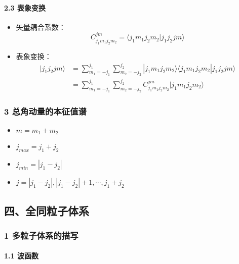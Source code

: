 \documentclass[UTF8,twocolumn]{ctexart}
\providecommand{\tightlist}{%
  \setlength{\itemsep}{0pt}\setlength{\parskip}{0pt}}
\let\oldparagraph\paragraph
\renewcommand{\paragraph}[1]{\oldparagraph{#1}\mbox{}}
\begin{document}
\hypertarget{ux8868ux8c61ux53d8ux6362}{%
\paragraph{ 2.3 表象变换}\label{ux8868ux8c61ux53d8ux6362}}

\begin{itemize}
\tightlist
\item
  矢量耦合系数：
  \[C_{j_1m_1j_2m_2}^{jm}=\langle j_1m_1j_2m_2|j_1j_2jm\rangle\]
\item
  表象变换： \[\begin{aligned}
  |j_1j_2jm\rangle&=\sum_{m_1=-j_1}^{j_1}\sum_{m_2=-j_2}^{j_2}|j_1m_1j_2m_2\rangle\langle j_1m_1j_2m_2|j_1j_2jm\rangle \\
  &=\sum_{m_1=-j_1}^{j_1}\sum_{m_2=-j_2}^{j_2}C_{j_1m_1j_2m_2}^{jm}|j_1m_1j_2m_2\rangle
  \end{aligned}\]
\end{itemize}

\hypertarget{ux603bux89d2ux52a8ux91cfux7684ux672cux5f81ux503cux8c31}{%
\subsubsection{3
总角动量的本征值谱}\label{ux603bux89d2ux52a8ux91cfux7684ux672cux5f81ux503cux8c31}}

\begin{itemize}
\tightlist
\item
  \(m=m_1+m_2\)
\item
  \(j_{max}=j_1+j_2\)
\item
  \(j_{min}=|j_1-j_2|\)
\item
  \(j=|j_1-j_2|,|j_1-j_2|+1,\cdots,j_1+j_2\)
\end{itemize}

\hypertarget{ux56dbux5168ux540cux7c92ux5b50ux4f53ux7cfb}{%
\subsection{四、全同粒子体系}\label{ux56dbux5168ux540cux7c92ux5b50ux4f53ux7cfb}}

\hypertarget{ux591aux7c92ux5b50ux4f53ux7cfbux7684ux63cfux5199}{%
\subsubsection{1
多粒子体系的描写}\label{ux591aux7c92ux5b50ux4f53ux7cfbux7684ux63cfux5199}}

\hypertarget{ux6ce2ux51fdux6570}{%
\paragraph{ 1.1 波函数}\label{ux6ce2ux51fdux6570}}
\end{document}
